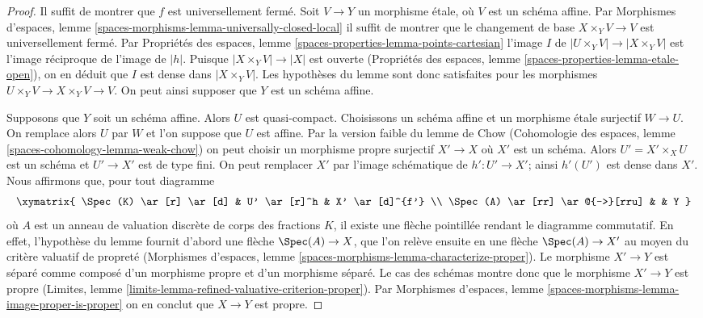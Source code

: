\begin{proof}
Il suffit de montrer que $f$ est universellement ferm\'e.
Soit $V \to Y$ un morphisme \'etale, o\`u $V$ est un sch\'ema affine.
Par Morphismes d'espaces, lemme
\ref{spaces-morphisms-lemma-universally-closed-local}
il suffit de montrer que le changement de base $X \times_Y V \to V$ est
universellement ferm\'e. Par Propri\'et\'es des espaces, lemme
\ref{spaces-properties-lemma-points-cartesian}
l'image $I$ de $|U \times_Y V| \to |X \times_Y V|$
est l'image r\'eciproque de l'image de $|h|$. Puisque
$|X \times_Y V| \to |X|$ est ouverte
(Propri\'et\'es des espaces, lemme \ref{spaces-properties-lemma-etale-open}),
on en d\'eduit que $I$ est dense dans $|X \times_Y V|$.
Les hypoth\`eses du lemme sont donc
satisfaites pour les morphismes $U \times_Y V \to X \times_Y V \to V$.
On peut ainsi supposer que $Y$ est un sch\'ema affine.

\medskip\noindent
Supposons que $Y$ soit un sch\'ema affine. Alors $U$ est quasi-compact. Choisissons
un sch\'ema affine et un morphisme \'etale surjectif $W \to U$.
On remplace alors $U$ par $W$ et l'on suppose que $U$ est affine.
Par la version faible du lemme de Chow
(Cohomologie des espaces, lemme \ref{spaces-cohomology-lemma-weak-chow})
on peut choisir un morphisme propre surjectif $X' \to X$
o\`u $X'$ est un sch\'ema. Alors $U' = X' \times_X U$ est un sch\'ema
et $U' \to X'$ est de type fini. On peut remplacer $X'$ par
l'image sch\'ematique de $h' : U' \to X'$; ainsi $h'(U')$
est dense dans $X'$. Nous affirmons que, pour tout diagramme
$$
\xymatrix{
\Spec(K) \ar[r] \ar[d] & U' \ar[r]^h & X' \ar[d]^{f'} \\
\Spec(A) \ar[rr] \ar@{-->}[rru] & & Y
}
$$
o\`u $A$ est un anneau de valuation discr\`ete de corps des fractions $K$, il
existe une fl\`eche pointill\'ee rendant le diagramme commutatif. En effet, l'hypoth\`ese du
lemme fournit d'abord une fl\`eche $\Spec(A) \to X$, que l'on rel\`eve ensuite
en une fl\`eche $\Spec(A) \to X'$ au moyen du crit\`ere valuatif de propret\'e
(Morphismes d'espaces, lemme \ref{spaces-morphisms-lemma-characterize-proper}).
Le morphisme $X' \to Y$ est s\'epar\'e
comme compos\'e d'un morphisme propre et d'un morphisme s\'epar\'e.
Le cas des sch\'emas montre donc que le morphisme $X' \to Y$ est propre
(Limites, lemme
\ref{limits-lemma-refined-valuative-criterion-proper}).
Par Morphismes d'espaces, lemme
\ref{spaces-morphisms-lemma-image-proper-is-proper}
on en conclut que $X \to Y$ est propre.
\end{proof}

